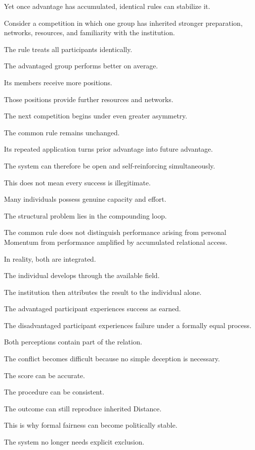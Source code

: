 Yet once advantage has accumulated, identical rules can stabilize it.

Consider a competition in which one group has inherited stronger preparation, networks, resources, and familiarity with the institution.

The rule treats all participants identically.

The advantaged group performs better on average.

Its members receive more positions.

Those positions provide further resources and networks.

The next competition begins under even greater asymmetry.

The common rule remains unchanged.

Its repeated application turns prior advantage into future advantage.

The system can therefore be open and self-reinforcing simultaneously.

This does not mean every success is illegitimate.

Many individuals possess genuine capacity and effort.

The structural problem lies in the compounding loop.

The common rule does not distinguish performance arising from personal Momentum from performance amplified by accumulated relational access.

In reality, both are integrated.

The individual develops through the available field.

The institution then attributes the result to the individual alone.

The advantaged participant experiences success as earned.

The disadvantaged participant experiences failure under a formally equal process.

Both perceptions contain part of the relation.

The conflict becomes difficult because no simple deception is necessary.

The score can be accurate.

The procedure can be consistent.

The outcome can still reproduce inherited Distance.

This is why formal fairness can become politically stable.

The system no longer needs explicit exclusion.

